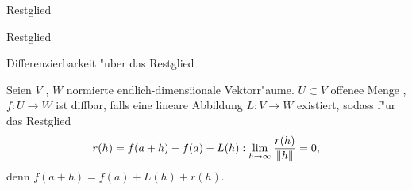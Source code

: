 \documentclass[class=article, crop=false]{standalone}
\begin{document}
\begin{zettel}{Restglied}
\begin{flashcard}[r2tb1l5i]{Restglied}
	\begin{question}
		Differenzierbarkeit "uber das Restglied
	\end{question}
	\begin{definition}
		Seien $V$ , $W$ normierte endlich-dimensiionale Vektorr"aume. $U \subset V$ offenee Menge , $f: U \to W$ ist diffbar, falls eine lineare Abbildung $L: V \to  W$ existiert, sodass f"ur das Restglied
		\[
			r (h)=  f ( a + h ) - f (a)- L (h) : \lim_{h \to \infty} \frac{r (h)}{ \left\|h\right\|} = 0
			,\]
		denn $f (a +h) = f (a) + L (h)+ r (h)$.
	\end{definition}

\end{flashcard}
\end{zettel}
\end{document}
